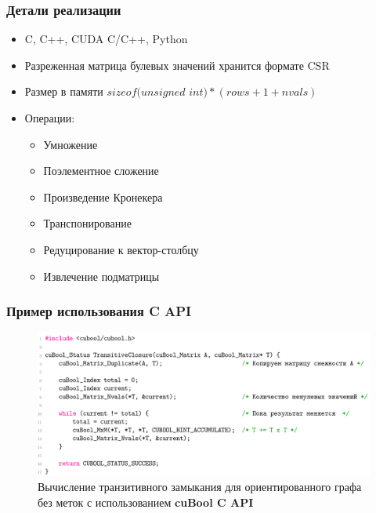 \documentclass[aspectratio=169,xcolor=table,english]{beamer}
\begin{document}
\begin{frame}[fragile] \frametitle{Детали реализации}
    \begin{itemize}
        \item C, C++, CUDA C/C++, Python
        \item Разреженная матрица булевых значений хранится формате CSR
        \item Размер в памяти $\textit{sizeof(unsigned int)} * (\textit{rows} + 1 + \textit{nvals})$
        \item Операции: 
        {
        \begin{itemize}
            \item Умножение
            \item Поэлементное сложение
            \item Произведение Кронекера
            \item Транспонирование
            \item Редуцирование к вектор-столбцу
            \item Извлечение подматрицы
        \end{itemize}
        }
    \end{itemize}
\end{frame}

\begin{frame}[fragile] \frametitle{Пример использования C API}
    \begin{center} 
    \begin{minipage}[m]{0.9\linewidth}
        \begin{figure}
            \centering
            \includegraphics[width=\textwidth]{figures/tc_c_api.png}
            \caption{Вычисление транзитивного замыкания для ориентированного графа без меток с использованием \textbf{cuBool C API}}
        \end{figure}
    \end{minipage}\hfill    
    \end{center}   
\end{frame}
\end{document}
